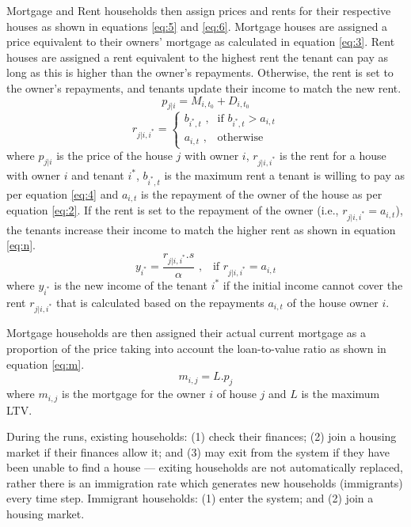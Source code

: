 Mortgage and Rent households then assign prices and rents for their respective houses as shown in equations \ref{eq:5} and  \ref{eq:6}. Mortgage houses are assigned a price equivalent to their owners' mortgage as calculated in equation \ref{eq:3}. Rent houses are assigned a rent equivalent to the highest rent the tenant can pay as long as this is higher than the owner's repayments. Otherwise, the rent is set to the owner's repayments, and tenants update their income to match the new rent.
\begin{equation} \label{eq:5}
    p_{j|i} = M_{i,t_0} + D_{i,{t_0}}
\end{equation}
\begin{equation} \label {eq:6}
    r_{j|i,i^*} = 
    \begin{cases}
        b_{i^*,t}\text{ ,} & \text{if } b_{i^*,t} > a_{i,t} \\
        a_{i,t}\text{ ,} & \text{otherwise}
    \end{cases}
\end{equation}
where \(p_{j|i}\) is the price of the house \(j\) with owner \(i\), \(r_{j|i,i^*}\) is the rent for a house with  owner \(i\) and tenant \(i^*\), \(b_{i^*,t}\) is the maximum rent a tenant is willing to pay as per equation \ref{eq:4} and \(a_{i,t}\) is the repayment of the owner of the house as per equation \ref{eq:2}. If the rent is set to the repayment of the owner (i.e., \(r_{j|i,i^*} = a_{i,t}\)), the tenants increase their income to match the higher rent as shown in equation \ref{eq:n}.
\begin{equation}\label{eq:n}
    y_{i^*} = \frac{r_{j|i,i^*}.s}{\alpha}\text{ ,} \quad \text{if } r_{j|i,i^*} = a_{i,t}
\end{equation}
where \(y_{i^*}\) is the new income of the tenant \(i^*\) if the initial income cannot cover the rent \(r_{j|i,i^*}\) that is calculated based on the repayments \(a_{i,t}\) of the house owner \(i\).

Mortgage households are then assigned their actual current mortgage as a proportion of the price taking into account the loan-to-value ratio as shown in equation \ref{eq:m}.
\begin{equation} \label{eq:m}
    m_{i,j} = L.p_j
\end{equation}
where \(m_{i,j}\) is the mortgage for the owner \(i\) of house \(j\) and \(L\) is the maximum LTV.


During the runs, existing households: (1) check their finances; (2) join a housing market if their finances allow it; and (3) may exit from the system if they have been unable to find a house --- exiting households are not automatically replaced, rather there is an immigration rate which generates new households (immigrants) every time step. Immigrant households: (1) enter the system; and (2) join a housing market.

